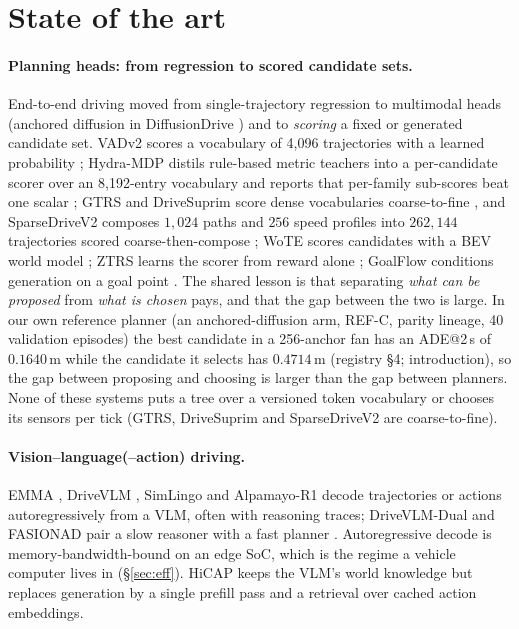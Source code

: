 \section{State of the art}\label{sec:related}
\paragraph{Planning heads: from regression to scored candidate sets.}
End-to-end driving moved from single-trajectory regression \citep{hu2023uniad,jiang2023vad} to multimodal heads
(anchored diffusion in DiffusionDrive \citep{liao2024diffusiondrive}) and to \emph{scoring} a fixed or generated candidate set.
VADv2 scores a vocabulary of 4{,}096 trajectories with a learned probability \citep{chen2024vadv2}; Hydra-MDP distils
rule-based metric teachers into a per-candidate scorer over an 8{,}192-entry vocabulary and reports that per-family
sub-scores beat one scalar \citep{li2024hydramdp}; GTRS and DriveSuprim score dense vocabularies coarse-to-fine
\citep{li2025gtrs,yao2025drivesuprim}, and SparseDriveV2 composes $1{,}024$ paths and $256$ speed profiles into $262{,}144$ trajectories scored coarse-then-compose \citep{sun2026sparsedrivev2}; WoTE scores candidates with a BEV world model \citep{li2025wote};
ZTRS learns the scorer from reward alone \citep{li2025ztrs}; GoalFlow conditions generation on a goal point \citep{xing2025goalflow}.
The shared lesson is that separating \emph{what can be proposed} from \emph{what is chosen} pays, and that the gap between the two is
large. In our own reference planner (an anchored-diffusion arm, REF-C, parity lineage, 40 validation episodes) the best candidate in a 256-anchor fan has an ADE@2\,s of $0.1640$\,m while the candidate it selects has
$0.4714$\,m\evI{} (registry \S4; introduction), so the gap between proposing and choosing is larger than the gap between planners. None of these systems puts a tree over a versioned token vocabulary or chooses its sensors per tick (GTRS, DriveSuprim and SparseDriveV2 are coarse-to-fine).

\paragraph{Vision--language(--action) driving.}
EMMA \citep{hwang2024emma}, DriveVLM \citep{tian2024drivevlm}, SimLingo \citep{renz2025simlingo} and Alpamayo-R1
\citep{nvidia2025alpamayor1} decode trajectories or actions autoregressively from a VLM, often with reasoning traces;
DriveVLM-Dual and FASIONAD pair a slow reasoner with a fast planner \citep{tian2024drivevlm,qian2024fasionad}.
Autoregressive decode is memory-bandwidth-bound on an edge SoC, which is the regime a vehicle computer lives in
(\S\ref{sec:eff}). HiCAP keeps the VLM's world knowledge but replaces generation by a single prefill pass and a
retrieval over cached action embeddings.

